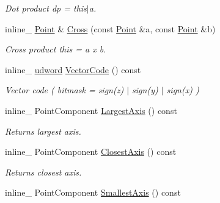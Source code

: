 \begin{DoxyCompactItemize}
\begin{DoxyCompactList}\small\item\em Dot product dp = this$\vert$a. \end{DoxyCompactList}\item 
inline\+\_\+ \hyperlink{classPoint}{Point} \& \hyperlink{classPoint_aaf4585111503ec655a49ababa510ad6e}{Cross} (const \hyperlink{classPoint}{Point} \&a, const \hyperlink{classPoint}{Point} \&b)\hypertarget{classPoint_aaf4585111503ec655a49ababa510ad6e}{}\label{classPoint_aaf4585111503ec655a49ababa510ad6e}

\begin{DoxyCompactList}\small\item\em Cross product this = a x b. \end{DoxyCompactList}\item 
inline\+\_\+ \hyperlink{IceTypes_8h_a44c6f1920ba5551225fb534f9d1a1733}{udword} \hyperlink{classPoint_a06e62d91a76b3f972994d0408ab1e916}{Vector\+Code} () const \hypertarget{classPoint_a06e62d91a76b3f972994d0408ab1e916}{}\label{classPoint_a06e62d91a76b3f972994d0408ab1e916}

\begin{DoxyCompactList}\small\item\em Vector code ( bitmask = sign(z) $\vert$ sign(y) $\vert$ sign(x) ) \end{DoxyCompactList}\item 
inline\+\_\+ Point\+Component \hyperlink{classPoint_a341eeb6f9f8fc6c0cab95e4dc2b88311}{Largest\+Axis} () const \hypertarget{classPoint_a341eeb6f9f8fc6c0cab95e4dc2b88311}{}\label{classPoint_a341eeb6f9f8fc6c0cab95e4dc2b88311}

\begin{DoxyCompactList}\small\item\em Returns largest axis. \end{DoxyCompactList}\item 
inline\+\_\+ Point\+Component \hyperlink{classPoint_a4bbe08fc9dd5b8a8082cdbed13fc9988}{Closest\+Axis} () const \hypertarget{classPoint_a4bbe08fc9dd5b8a8082cdbed13fc9988}{}\label{classPoint_a4bbe08fc9dd5b8a8082cdbed13fc9988}

\begin{DoxyCompactList}\small\item\em Returns closest axis. \end{DoxyCompactList}\item 
inline\+\_\+ Point\+Component \hyperlink{classPoint_ab67cfc65c221a517c6c28321c6cb8b3c}{Smallest\+Axis} () const \hypertarget{classPoint_ab67cfc65c221a517c6c28321c6cb8b3c}{}\label{classPoint_ab67cfc65c221a517c6c28321c6cb8b3c}


\end{DoxyCompactItemize}
